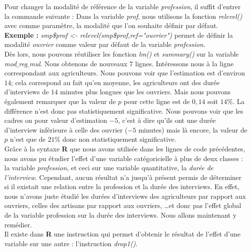 Pour changer la modalité de référence de la variable \textit{profession}, il suffit d'entrer la commande suivante : \newline
Dans la variable \textit{prof}, nous utilisons la fonction \textit{relevel()} avec comme paramètre, la modalité que l'on souhaite définir par défaut. \textbf{Exemple : } \textit{smp\$prof <- relevel(smp\$prof,ref="ouvrier")} permet de définir la modalité \textit{ouvrier} comme valeur par défaut de la variable \textit{profession}.\newline
\\
Dès lors, nous pouvons réutiliser les fonction \textit{lm()} et \textit{summary()} sur la variable \textit{mod$\_$reg$\_$mul}.\newline
Nous obtenons de nouveaux $7$ lignes. Intéressons nous à la ligne correspondant aux agriculteurs. \newline
Nous pouvons voir que l'estimation est d'environ $14$; cela correspond au fait qu'en moyenne, les agriculteurs ont des durée d'interviews de $14$ minutes plus longues que les ouvriers. Mais nous pouvons également remarquer que la valeur de $p$ pour cette ligne est de $0,14$ soit $14\%$. La différence n'est donc pas statistiquement significative.\newline
Nous pouvons voir que les cadres on pour valeur d'estimation $-5$, c'est à dire qu'ils ont une durée d'interview inférieure à celle des ouvrier ($-5$ minutes) mais là encore, la valeur de $p$ n'est que de $21\%$ donc non statistiquement significative.\newline 
\\
Grâce à la syntaxe \textbf{R} que nous avons utilisée dans les lignes de code précédentes, nous avons pu étudier l'effet d'une variable catégoricielle à plus de deux classes : la variable \textit{profession}, et ceci sur une variable quantitative, la \textit{durée de l'interview}.\newline
Cependant, aucun résultat n'a jusqu'à présent permis de déterminer si il existait une relation entre la profession et la durée des interviews. En effet, nous n'avons juste étudié les durées d'interviews des agriculteurs par rapport aux ouvriers, celles des artisans par rapport aux ouvriers, \dots et donc pas l'effet global de la variable profession sur la durée des interviews.\newline
Nous allons maintenant y remédier.\newline
\\
Il existe dans \textbf{R} une instruction qui permet d'obtenir le résultat de l'effet d'une variable sur une autre : l'instruction \textit{drop1()}. 






